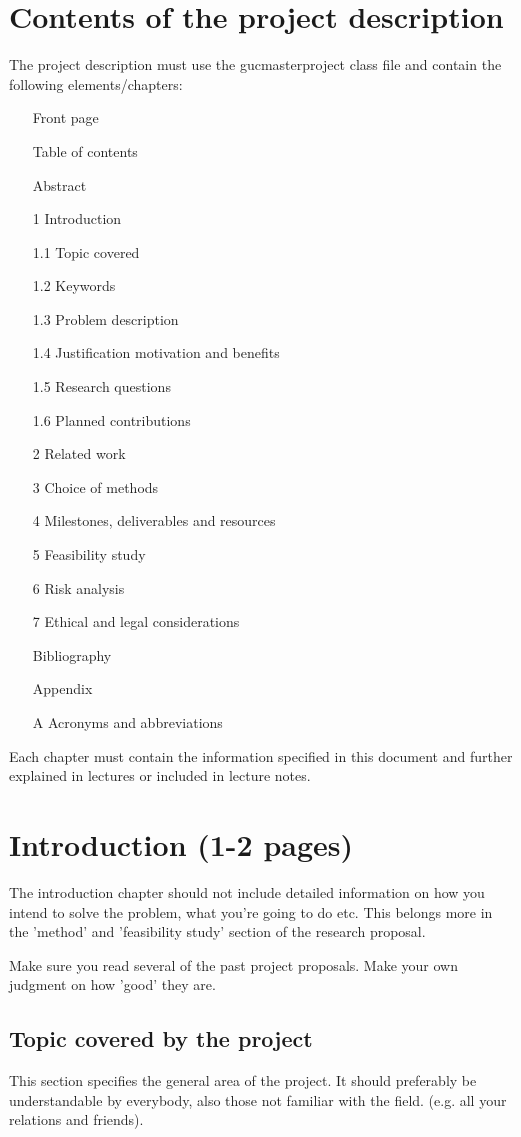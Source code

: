 \documentclass[informationsecurity]{gucmasterproject}
\begin{document}
\chapter{Contents of the project description}
The project description must use the gucmasterproject class file and contain the following elements/chapters:
\begin{itemize}
\item[] Front page
\item[] Table of contents
\item[] Abstract
\item[1] Introduction
\item[1.1] Topic covered
\item[1.2] Keywords
\item[1.3] Problem description
\item[1.4] Justification motivation and benefits
\item[1.5] Research questions
\item[1.6] Planned contributions
\item[2]Related work
\item[3] Choice of methods
\item[4]Milestones, deliverables and resources
\item[5]Feasibility study
\item[6]Risk analysis
\item[7]Ethical and legal considerations
\item[] Bibliography
\item[] Appendix
\item[A] Acronyms and abbreviations

\end{itemize}

Each chapter must contain the information specified in this document and further explained in 
lectures or included in lecture notes.

\chapter{Introduction (1-2 pages)}
The introduction chapter should not include detailed information on
how you intend to solve the problem, what you're going to do etc.
This belongs more in the 'method' and 'feasibility study' section
of the research proposal.

Make sure you read several of the past project proposals.
Make your own judgment on how 'good' they are.

\section{Topic covered by the project}
This section specifies the general area of the project.
It should preferably be understandable by everybody,
also those not familiar with the field. (e.g. all your relations and friends).
\end{document}
